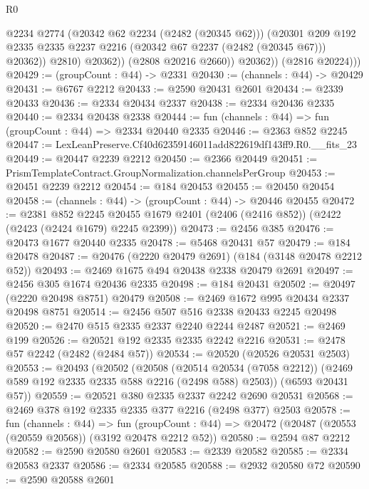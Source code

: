 \begin{lexlean}{R0}
\begin{coremodule}
                      @2234
                      @2774
                      (@20342 @62 @2234 (@2482 (@20345 @62)))
                      (@20301
                        @209
                        @192
                        @2335
                        @2335
                        @2237
                        @2216
                        (@20342 @67 @2237 (@2482 (@20345 @67)))
                        @20362))
                    @2810)
                  @20362))
              (@2808 @20216 @2660))
            @20362))
        (@2816 @20224)))
@20429 := (groupCount : @44) -> @2331
@20430 := (channels : @44) -> @20429
@20431 := @6767 @2212
@20433 := @2590 @20431 @2601
@20434 := @2339 @20433
@20436 := @2334 @20434 @2337
@20438 := @2334 @20436 @2335
@20440 := @2334 @20438 @2338
@20444 := fun (channels : @44) => fun (groupCount : @44) => @2334 @20440 @2335
@20446 := @2363 @852 @2245
@20447 := LexLeanPreserve.Cf40d62359146011add822619df143ff9.R0.__fits_23
@20449 := @20447 @2239 @2212
@20450 := @2366 @20449
@20451 := PrismTemplateContract.GroupNormalization.channelsPerGroup
@20453 := @20451 @2239 @2212
@20454 := @184 @20453
@20455 := @20450 @20454
@20458 := (channels : @44) -> (groupCount : @44) -> @20446 @20455
@20472 := @2381
    @852
    @2245
    @20455
    @1679
    @2401
    (@2406 (@2416 @852))
    (@2422 (@2423 (@2424 @1679) @2245 @2399))
@20473 := @2456 @385
@20476 := @20473 @1677 @20440 @2335
@20478 := @5468 @20431 @57
@20479 := @184 @20478
@20487 := @20476 (@2220 @20479 @2691) (@184 (@3148 @20478 @2212 @52))
@20493 := @2469 @1675 @494 @20438 @2338 @20479 @2691
@20497 := @2456 @305 @1674 @20436 @2335
@20498 := @184 @20431
@20502 := @20497 (@2220 @20498 @8751) @20479
@20508 := @2469 @1672 @995 @20434 @2337 @20498 @8751
@20514 := @2456 @507 @516 @2338 @20433 @2245 @20498
@20520 := @2470 @515 @2335 @2337 @2240 @2244 @2487
@20521 := @2469 @199
@20526 := @20521 @192 @2335 @2335 @2242 @2216
@20531 := @2478 @57 @2242 (@2482 (@2484 @57))
@20534 := @20520 (@20526 @20531 @2503)
@20553 := @20493
    (@20502
      (@20508
        (@20514 @20534 (@7058 @2212))
        (@2469 @589 @192 @2335 @2335 @588 @2216 (@2498 @588) @2503))
      (@6593 @20431 @57))
@20559 := @20521 @380 @2335 @2337 @2242 @2690 @20531
@20568 := @2469 @378 @192 @2335 @2335 @377 @2216 (@2498 @377) @2503
@20578 := fun (channels : @44) =>
  fun (groupCount : @44) => @20472 (@20487 (@20553 (@20559 @20568)) (@3192 @20478 @2212 @52))
@20580 := @2594 @87 @2212
@20582 := @2590 @20580 @2601
@20583 := @2339 @20582
@20585 := @2334 @20583 @2337
@20586 := @2334 @20585
@20588 := @2932 @20580 @72
@20590 := @2590 @20588 @2601

\end{coremodule}
\end{lexlean}
